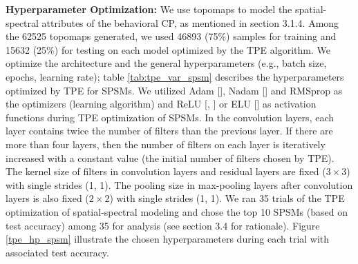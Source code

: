 \documentclass{article}
\begin{document}
\textbf{Hyperparameter Optimization:} We use topomaps to model the spatial-spectral attributes of the behavioral CP, as mentioned in section 3.1.4. Among the 62525 topomaps generated, we used 46893 (75\%) samples for training and 15632 (25\%) for testing on each model optimized by the TPE algorithm. We optimize the architecture and the general hyperparameters (e.g., batch size, epochs, learning rate); table \ref{tab:tpe_var_spsm} describes the hyperparameters optimized by TPE for SPSMs. We utilized Adam [\cite{adam}], Nadam [\cite{nadam}] and RMSprop as the optimizers (learning algorithm) and ReLU [\cite{relu}, \cite{relu_2}] or ELU [\cite{elu}] as activation functions during TPE optimization of SPSMs. In the convolution layers, each layer contains twice the number of filters than the previous layer. If there are more than four layers, then the number of filters on each layer is iteratively increased with a constant value (the initial number of filters chosen by TPE). The kernel size of filters in convolution layers and residual layers are fixed ($3 \times 3$) with single strides (1, 1). The pooling size in max-pooling layers after convolution layers is also fixed ($2 \times 2$) with single strides (1, 1). We ran 35 trials of the TPE optimization of spatial-spectral modeling and chose the top 10 SPSMs (based on test accuracy) among 35 for analysis (see section 3.4 for rationale). Figure \ref{tpe_hp_spsm} illustrate the chosen hyperparameters during each trial with associated test accuracy.
\end{document}
